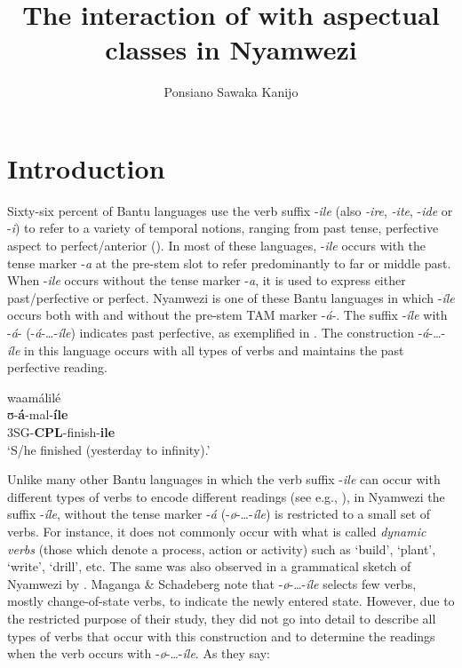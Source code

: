 \documentclass[output=paper]{langscibook}
\author{Ponsiano Sawaka Kanijo\affiliation{University of Gothenburg}}
\title{The interaction of  with aspectual classes in Nyamwezi}
\begin{document}

\section{Introduction}

Sixty-six percent of Bantu languages use the verb suffix -\textit{ile} (also \textit{-ire}, \textit{-ite}, -\textit{ide} or -\textit{i}) to refer to a variety of temporal notions, ranging from past tense, perfective aspect to perfect/anterior (\citealt{Nurse2008,Botne2010}). In most of these languages, -\textit{ile} occurs with the tense marker -\textit{a} at the pre-stem slot to refer predominantly to far or middle past. When -\textit{ile} occurs without the tense marker -\textit{a}, it is used to express either past/perfective or perfect. Nyamwezi is one of these Bantu languages in which -\textit{íle} occurs both with and without the pre-stem TAM marker -\textit{á}-. The suffix -\textit{íle} with -\textit{á}- (-\textit{á}-…-\textit{íle}) indicates past perfective, as exemplified in . The construction -\textit{á}-…-\textit{íle} in this language occurs with all types of verbs and maintains the past perfective reading. 

\ea \label{ex:kanijo:1}
\glll waamálilé\\
ʊ-\textbf{á}-mal-\textbf{íle}\\
3SG-\textbf{CPL}-finish-\textbf{ile}\\
\glt ‘S/he finished (yesterday to infinity).’\\
\z

Unlike many other Bantu languages in which the verb suffix -\textit{ile} can occur with different types of verbs to encode different readings (see e.g., \citealt{Brisard2009}), in Nyamwezi the suffix -\textit{íle}, without the tense marker -\textit{á} (-\textit{ø}-…-\textit{íle}) is restricted to a small set of verbs. For instance, it does not commonly occur with what is called \textit{dynamic} \textit{verbs} (those which denote a process, action or activity) such as ‘build’, ‘plant’, ‘write’, ‘drill’, etc. The same was also observed in a grammatical sketch of Nyamwezi by \citet{Maganga1992}. Maganga \& Schadeberg note that -\textit{ø}-…-\textit{íle} selects few verbs, mostly change-of-state verbs, to indicate the newly entered state. However, due to the restricted purpose of their study, they did not go into detail to describe all types of verbs that occur with this construction and to determine the readings when the verb occurs with -\textit{ø}-…-\textit{íle}. As they say:
\end{document}
